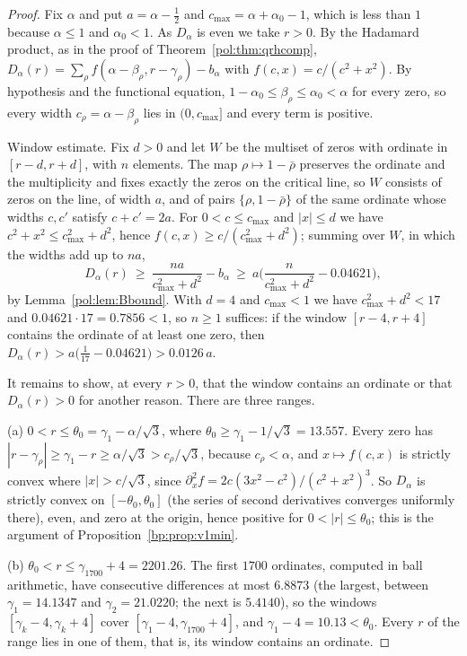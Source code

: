 \begin{proof}
Fix $\alpha$ and put $a=\alpha-\frac12$ and $c_{\max}=\alpha+\alpha_0-1$, which is less than $1$ because $\alpha\le1$ and $\alpha_0<1$. As $D_\alpha$ is even we take $r>0$. By the Hadamard product, as in the proof of Theorem~\ref{pol:thm:qrhcomp}, $D_\alpha(r)=\sum_\rho f(\alpha-\beta_\rho,r-\gamma_\rho)-b_\alpha$ with $f(c,x)=c/(c^2+x^2)$. By hypothesis and the functional equation, $1-\alpha_0\le\beta_\rho\le\alpha_0<\alpha$ for every zero, so every width $c_\rho=\alpha-\beta_\rho$ lies in $(0,c_{\max}]$ and every term is positive.

Window estimate. Fix $d>0$ and let $W$ be the multiset of zeros with ordinate in $[r-d,r+d]$, with $n$ elements. The map $\rho\mapsto1-\bar\rho$ preserves the ordinate and the multiplicity and fixes exactly the zeros on the critical line, so $W$ consists of zeros on the line, of width $a$, and of pairs $\{\rho,1-\bar\rho\}$ of the same ordinate whose widths $c,c'$ satisfy $c+c'=2a$. For $0<c\le c_{\max}$ and $|x|\le d$ we have $c^2+x^2\le c_{\max}^2+d^2$, hence $f(c,x)\ge c/(c_{\max}^2+d^2)$; summing over $W$, in which the widths add up to $na$,
\[
D_\alpha(r)\ \ge\ \frac{na}{c_{\max}^2+d^2}-b_\alpha\ \ge\ a\Big(\frac{n}{c_{\max}^2+d^2}-0.04621\Big),
\]
by Lemma~\ref{pol:lem:Bbound}. With $d=4$ and $c_{\max}<1$ we have $c_{\max}^2+d^2<17$ and $0.04621\cdot17=0.7856<1$, so $n\ge1$ suffices: if the window $[r-4,r+4]$ contains the ordinate of at least one zero, then $D_\alpha(r)>a\big(\frac1{17}-0.04621\big)>0.0126\,a$.

It remains to show, at every $r>0$, that the window contains an ordinate or that $D_\alpha(r)>0$ for another reason. There are three ranges.

(a) $0<r\le\theta_0=\gamma_1-\alpha/\sqrt3$, where $\theta_0\ge\gamma_1-1/\sqrt3=13.557$. Every zero has $|r-\gamma_\rho|\ge\gamma_1-r\ge\alpha/\sqrt3>c_\rho/\sqrt3$, because $c_\rho<\alpha$, and $x\mapsto f(c,x)$ is strictly convex where $|x|>c/\sqrt3$, since $\partial_x^2f=2c(3x^2-c^2)/(c^2+x^2)^3$. So $D_\alpha$ is strictly convex on $[-\theta_0,\theta_0]$ (the series of second derivatives converges uniformly there), even, and zero at the origin, hence positive for $0<|r|\le\theta_0$; this is the argument of Proposition~\ref{bp:prop:v1min}.

(b) $\theta_0<r\le\gamma_{1700}+4=2201.26$. The first $1700$ ordinates, computed in ball arithmetic, have consecutive differences at most $6.8873$ (the largest, between $\gamma_1=14.1347$ and $\gamma_2=21.0220$; the next is $5.4140$), so the windows $[\gamma_k-4,\gamma_k+4]$ cover $[\gamma_1-4,\gamma_{1700}+4]$, and $\gamma_1-4=10.13<\theta_0$. Every $r$ of the range lies in one of them, that is, its window contains an ordinate.


\end{proof}
